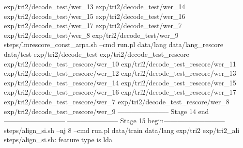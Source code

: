 exp/tri2/decode_test/wer_13
exp/tri2/decode_test/wer_14
exp/tri2/decode_test/wer_15
exp/tri2/decode_test/wer_16
exp/tri2/decode_test/wer_17
exp/tri2/decode_test/wer_7
exp/tri2/decode_test/wer_8
exp/tri2/decode_test/wer_9
steps/lmrescore_const_arpa.sh --cmd run.pl data/lang data/lang_rescore data/test exp/tri2/decode_test exp/tri2/decode_test_rescore
exp/tri2/decode_test_rescore/wer_10
exp/tri2/decode_test_rescore/wer_11
exp/tri2/decode_test_rescore/wer_12
exp/tri2/decode_test_rescore/wer_13
exp/tri2/decode_test_rescore/wer_14
exp/tri2/decode_test_rescore/wer_15
exp/tri2/decode_test_rescore/wer_16
exp/tri2/decode_test_rescore/wer_17
exp/tri2/decode_test_rescore/wer_7
exp/tri2/decode_test_rescore/wer_8
exp/tri2/decode_test_rescore/wer_9
----------------------- Stage 14 end---------------------------
----------------------- Stage 15 begin---------------------------
steps/align_si.sh --nj 8 --cmd run.pl data/train data/lang exp/tri2 exp/tri2_ali
steps/align_si.sh: feature type is lda
